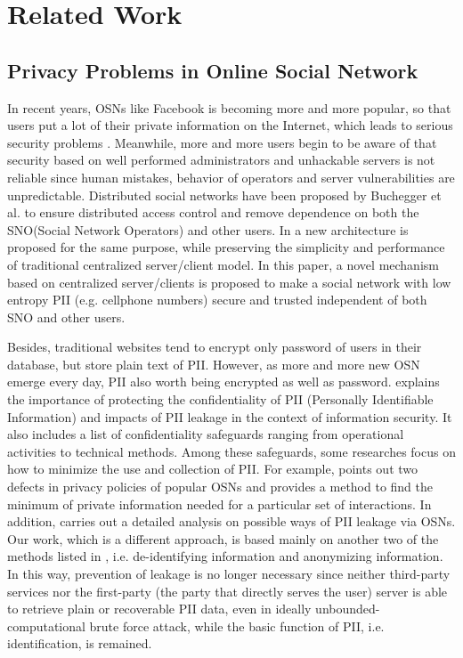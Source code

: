 \documentclass[10pt, conference, compsocconf]{IEEEtran}
\begin{document}

\section{Related Work}	\label{sec_rw}
	\subsection{Privacy Problems in Online Social Network}		
	In recent years, OSNs like Facebook is becoming more and more popular, 
	so that users put a lot of their private information on the Internet, which leads 
	to serious security problems \cite{lzf1, lzf2}. Meanwhile, more and more users
	begin to be aware of that security based on well performed administrators and unhackable 
	servers is not reliable since human mistakes, behavior of operators and server 
	vulnerabilities are unpredictable. Distributed social networks have been proposed by 
	Buchegger et al.\cite{lzf3, lzf4} to ensure distributed access control and
	remove dependence on both the SNO(Social Network Operators) and other users.
	In \cite{lzf5} a new architecture is proposed for the same purpose, 
	while preserving the simplicity and performance of traditional centralized server/client model.
	In this paper, a novel mechanism based on centralized 
	server/clients is proposed to make a social network with low entropy PII
	(e.g. cellphone numbers) secure and trusted independent of both SNO and other users.
	
	Besides, traditional websites tend to encrypt only password of users in their database, 
	but store plain text of PII. However, as more and more new OSN emerge every day, 
	PII also worth being encrypted as well as password. \cite{guide}
	explains the importance of protecting the confidentiality of PII (Personally 
	Identifiable Information) and impacts of PII leakage in the 
	context of information security. It also includes a list of confidentiality 
	safeguards ranging from operational activities to technical methods. Among 
	these safeguards, some researches focus on how to minimize the use and 
	collection of PII. For example, \cite{charact} points out two defects 
	in privacy policies of popular OSNs and provides a method to find the minimum 
	of private information needed for a particular set of interactions. In addition, 
	\cite{leakage} carries out a detailed analysis on possible ways of PII 
	leakage via OSNs. Our work, which is a different approach, is based mainly 
	on another two of the methods listed in \cite{guide}, i.e. de-identifying 
	information and anonymizing information. In this way, prevention of leakage is no 
	longer necessary since neither third-party services nor the first-party 
	(the party that directly serves the user) server is able to retrieve plain or 
	recoverable PII data, even in ideally unbounded-computational brute force attack, 
	while the basic function of PII, i.e. identification, is remained.
	
\end{document}
